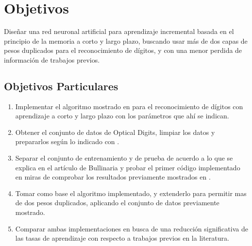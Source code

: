 \section{Objetivos}
    Diseñar una red neuronal artificial para aprendizaje incremental basada en el principio de la memoria a corto y largo plazo, buscando usar más de dos capas de pesos duplicados para el reconocimiento de dígitos, y con una menor perdida de información de trabajos previos.
    \subsection{Objetivos Particulares}
        \begin{enumerate}
            \item Implementar el algoritmo mostrado en \cite{bullinaria2009} para el reconocimiento de dígitos con aprendizaje a corto y largo plazo con los parámetros que ahí se indican.
            \item Obtener el conjunto de datos de Optical Digits, limpiar los datos y prepararlos según lo indicado con \cite{bullinaria2009}.
            \item Separar el conjunto de entrenamiento y de prueba de acuerdo a lo que se explica en el artículo de Bullinaria y probar el primer código implementado en miras de comprobar los resultados previamente mostrados en \cite{bullinaria2009}.
            \item Tomar como base el algoritmo implementado, y extenderlo para permitir mas de dos pesos duplicados, aplicando el conjunto de datos previamente mostrado.
            \item Comparar ambas implementaciones en busca de una reducción significativa de las tasas de aprendizaje con respecto a trabajos previos en la literatura.
        \end{enumerate}